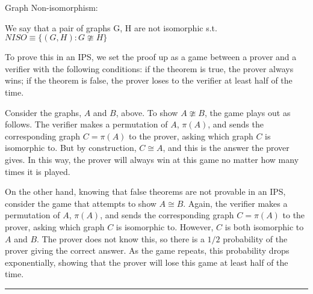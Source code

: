 \documentclass[twoside]{article}
\newenvironment{example}{{\bf Example:}}{\hfill\rule{2mm}{2mm}}
\begin{document}
\begin{example}
Graph Non-isomorphism:

We say that a pair of graphs G, H are not isomorphic s.t.
$NISO \equiv \{(G,H) : G  \ncong H \}$

To prove this in an IPS, we set the proof up as a game between a prover and a verifier with the following conditions: if the theorem is true, the prover always wins; if the theorem is false, the prover loses to the verifier at least half of the time. 

\begin{figure}[!htp]
\centering
{}
\qquad
{}
\label{fig:noniso}
\end{figure}

Consider the graphs, $A$ and $B$, above. 
To show $A \ncong B$, the game plays out as follows. 
The verifier makes a permutation of $A$, $\pi(A)$, and sends the corresponding graph $C = \pi(A)$ to the prover, asking which graph $C$ is isomorphic to. 
But by construction, $C \cong A$, and this is the answer the prover gives.
In this way, the prover will always win at this game no matter how many times it is played. 

On the other hand, knowing that false theorems are not provable in an IPS, consider the game that attempts to show $A \cong B$. 
Again, the verifier makes a permutation of $A$, $\pi(A)$, and sends the corresponding graph $C = \pi(A)$ to the prover, asking which graph $C$ is isomorphic to. 
However, $C$ is both isomorphic to $A$ and $B$. 
The prover does not know this, so there is a $1/2$ probability of the prover giving the correct answer. 
As the game repeats, this probability drops exponentially, showing that the prover will lose this game at least half of the time. 

\end{example}
\end{document}
